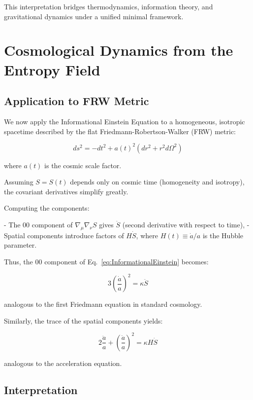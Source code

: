 \documentclass{article}
\begin{document}
This interpretation bridges thermodynamics, information theory, and gravitational dynamics under a unified minimal framework.

\section{Cosmological Dynamics from the Entropy Field}

\subsection{Application to FRW Metric}

We now apply the Informational Einstein Equation to a homogeneous, isotropic spacetime described by the flat Friedmann-Robertson-Walker (FRW) metric:

\begin{equation}
ds^2 = -dt^2 + a(t)^2 \left( dr^2 + r^2 d\Omega^2 \right)
\end{equation}

where $a(t)$ is the cosmic scale factor.

Assuming $S = S(t)$ depends only on cosmic time (homogeneity and isotropy), the covariant derivatives simplify greatly.

Computing the components:

- The $00$ component of $\nabla_\mu \nabla_\nu S$ gives $\ddot{S}$ (second derivative with respect to time),
- Spatial components introduce factors of $H \dot{S}$, where $H(t) \equiv \dot{a}/a$ is the Hubble parameter.

Thus, the $00$ component of Eq.~\eqref{eq:InformationalEinstein} becomes:

\begin{equation}
3\left( \frac{\dot{a}}{a} \right)^2 = \kappa \ddot{S}
\label{eq:FriedmannEntropy}
\end{equation}

analogous to the first Friedmann equation in standard cosmology.

Similarly, the trace of the spatial components yields:

\begin{equation}
2\frac{\ddot{a}}{a} + \left( \frac{\dot{a}}{a} \right)^2 = \kappa H \dot{S}
\label{eq:AccelerationEntropy}
\end{equation}

analogous to the acceleration equation.

\subsection{Interpretation}
\end{document}
